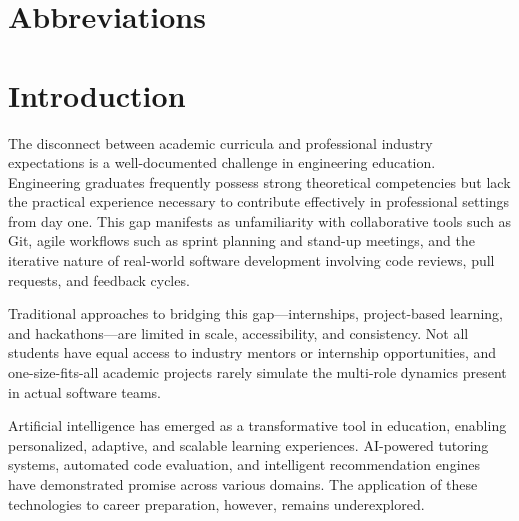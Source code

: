\documentclass[12pt,a4paper]{report}
\begin{document}
\chapter*{Abbreviations}

\begin{acronym}[ACRONYM]
\end{acronym}

\newpage
{}


\chapter{Introduction}

The disconnect between academic curricula and professional industry expectations is a well-documented challenge in engineering education. Engineering graduates frequently possess strong theoretical competencies but lack the practical experience necessary to contribute effectively in professional settings from day one. This gap manifests as unfamiliarity with collaborative tools such as Git, agile workflows such as sprint planning and stand-up meetings, and the iterative nature of real-world software development involving code reviews, pull requests, and feedback cycles.

Traditional approaches to bridging this gap---internships, project-based learning, and hackathons---are limited in scale, accessibility, and consistency. Not all students have equal access to industry mentors or internship opportunities, and one-size-fits-all academic projects rarely simulate the multi-role dynamics present in actual software teams.

Artificial intelligence has emerged as a transformative tool in education, enabling personalized, adaptive, and scalable learning experiences. AI-powered tutoring systems, automated code evaluation, and intelligent recommendation engines have demonstrated promise across various domains. The application of these technologies to career preparation, however, remains underexplored.
\end{document}
